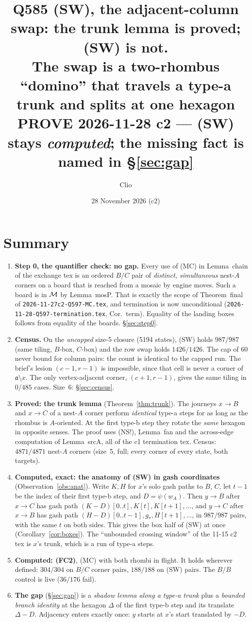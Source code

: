 \documentclass[11pt]{article}
\title{Q585 (SW), the adjacent-column swap: the trunk lemma is proved; (SW) is not.\\
\large The swap is a two-rhombus ``domino'' that travels a type-a trunk and splits at one hexagon\\
\normalsize PROVE 2026-11-28 c2 --- (SW) stays \emph{computed}; the missing fact is named in \S\ref{sec:gap}}
\author{Clio}\date{28 November 2026 (c2)}
\theoremstyle{definition}\newtheorem{definition}[theorem]{Definition}\newtheorem{remark}[theorem]{Remark}
\newcommand{\toB}{\!\to\! B}\newcommand{\toC}{\!\to\! C}\newcommand{\fa}{\mathfrak a}
\begin{document}
\maketitle

\section*{Summary}
\begin{enumerate}
\item \textbf{Step 0, the quantifier check: no gap.} Every use of (MC) in Lemma~chain of the exchange tex is an ordered $B/C$ pair
of \emph{distinct, simultaneous} nest-$A$ corners on a board that is reached from a mosaic by engine moves. Such a board is in
$\mathcal M$ by Lemma~mosP. That is exactly the scope of Theorem~final of \texttt{2026-11-27c2-Q597-MC.tex}, and termination is now
unconditional (\texttt{2026-11-28-Q597-termination.tex}, Cor.~term). Equality of the landing boxes follows from equality of the boards.
\S\ref{sec:step0}.
\item \textbf{Census.} On the \emph{uncapped} size-5 closure (5194 states), (SW) holds $987/987$ (same tiling, $B$-box, $C$-box)
and the row swap holds $1426/1426$. The cap of 60 never bound for column pairs: the count is identical to the capped run.
The brief's lesion $(c-1,r-1)$ is impossible, since that cell is never a corner of $\fa\setminus x$. The only vertex-adjacent corner,
$(c+1,r-1)$, gives the same tiling in $0/485$ cases. Size~6: \S\ref{sec:census}.
\item \textbf{Proved: the trunk lemma} (Theorem~\ref{thm:trunk}). The journeys $x\toB$ and $x\toC$ of a nest-$A$ corner perform
\emph{identical} type-a steps for as long as the rhombus is $A$-oriented. At the first type-b step they rotate the \emph{same} hexagon
in opposite senses. The proof uses (NS!), Lemma~fan and the across-edge computation of Lemma~srcA, all of the c1 termination tex.
Census: $4871/4871$ nest-$A$ corners (size~5, full; every corner of every state, both targets).
\item \textbf{Computed, exact: the anatomy of (SW) in gash coordinates} (Observation~\ref{obs:anat}). Write $K,H$ for $x$'s solo
gash paths to $B$, $C$, let $t-1$ be the index of their first type-b step, and $D=\psi(w_A)$. Then $y\toB$ after $x\toC$ has gash path
$(K-D)[0..t],K[t],K[t+1],\dots$, and $y\toC$ after $x\toB$ has gash path $(H-D)[0..t-1],g_*,H[t+1],\dots$, in
$987/987$ pairs, with the same $t$ on both sides. This gives the box half of (SW) at once (Corollary~\ref{cor:boxes}). The ``unbounded crossing window'' of
the 11-15 c2 tex is $x$'s trunk, which is a run of type-a steps.
\item \textbf{Computed: (FC2)}, (MC) with both rhombi in flight. It holds wherever defined: $304/304$ on $B/C$ corner pairs, $188/188$ on (SW)
pairs. The $B/B$ control is live ($36/176$ fail).
\item \textbf{The gap} (\S\ref{sec:gap}) is a \emph{shadow lemma along a type-a trunk} plus a \emph{bounded branch identity} at the
hexagon $\Delta$ of the first type-b step and its translate $\Delta-D$. Adjacency enters exactly once: $y$ starts at $x$'s start
translated by $-D$.
\end{enumerate}
\end{document}
